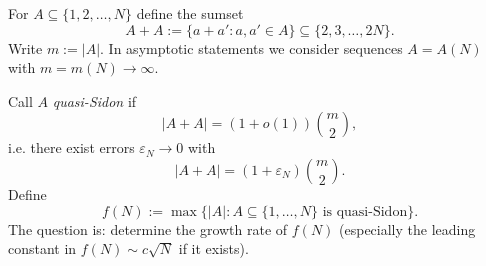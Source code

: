For $A\subseteq\{1,2,\dots,N\}$ define the sumset
\[
A+A:=\{a+a': a,a'\in A\} \subseteq \{2,3,\dots,2N\}.
\]
Write $m:=|A|$.  In asymptotic statements we consider sequences $A=A(N)$ with $m=m(N)\to\infty$.

Call $A$ \emph{quasi-Sidon} if
\[
|A+A| = (1+o(1))\binom{m}{2},
\]
i.e. there exist errors $\varepsilon_N\to 0$ with
\[
|A+A| = (1+\varepsilon_N)\binom{m}{2}.
\]
Define
\[
f(N):=\max\{|A|: A\subseteq\{1,\dots,N\}\text{ is quasi-Sidon}\}.
\]
The question is: determine the growth rate of $f(N)$ (especially the leading constant in $f(N)\sim c\sqrt N$ if it exists).
